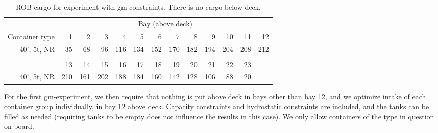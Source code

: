 \begin{table}[htbp]
\begin{small}
\begin{center}
\begin{tabular}{r|*{12}{r}}
&\multicolumn{12}{c}{Bay (above deck)}\\
Container type&1&2&3&4&5&6&7&8&9&10&11&12\\
\hline
40', 5t, NR & 35&68&96&116&134&152&170&182&194&204&208&212\\
\multicolumn{5}{c}{}\\
&13&14&15&16&17&18&19&20&21&22&23\\
\hline
40', 5t, NR &210&161&202&188&184&160&142&128&106&88&20\\
\end{tabular}
\end{center}
\end{small}
\caption{ROB cargo for experiment with gm constraints. There is no cargo below deck.}\label{tab:ROBGM}
\end{table}

For the first gm-experiment, we then require that nothing is put above deck in bays other than bay 12, and we optimize intake of each container group individually, in bay 12 above deck. Capacity constraints and hydrostatic constraints are included, and the tanks can be filled as needed (requiring tanks to be empty does not influence the results in this case). We only allow containers of the type in question on board. %

